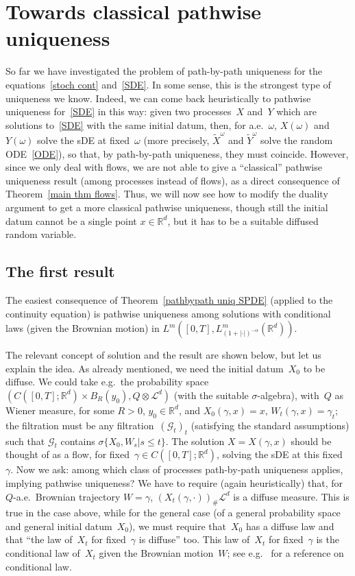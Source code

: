 \documentclass[a4paper,10pt]{article}
\newcommand\1{\mathbbm{1}}
\newcommand{\mc}{\mathcal}
\newcommand{\td}{\tilde}
\numberwithin{equation}{section}
\begin{document}
\section{Towards classical pathwise uniqueness}

So far we have investigated the problem of path-by-path uniqueness for the equations~\eqref{stoch cont} and~\eqref{SDE}. In some sense, this is the strongest type of uniqueness we know. Indeed, we can come back heuristically to pathwise uniqueness for~\eqref{SDE} in this way: given two processes~$X$ and~$Y$ which are solutions to~\eqref{SDE} with the same initial datum, then, for a.e.~$\omega$, $X(\omega)$ and $Y(\omega)$ solve the sDE at fixed~$\omega$ (more precisely, $\td{X}^\omega$ and $\td{Y}^\omega$ solve the random ODE~\eqref{ODE}), so that, by path-by-path uniqueness, they must coincide. However, since we only deal with flows, we are not able to give a ``classical'' pathwise uniqueness result (among processes instead of flows), as a direct consequence of Theorem~\ref{main thm flows}. Thus, we will now see how to modify the duality argument to get a more classical pathwise uniqueness, though still the initial datum cannot be a single point $x \in \mathbb{R}^d$, but it has to be a suitable diffused random variable.

\subsection{The first result}\label{firstpathwise}

The easiest consequence of Theorem~\ref{pathbypath uniq SPDE} (applied to the continuity equation) is pathwise uniqueness among solutions with conditional laws (given the Brownian motion) in $L^m([0,T],L^m_{(1+|\cdot|)^{-\alpha}}(\mathbb{R}^d))$.

The relevant concept of solution and the result are shown below, but let us explain the idea. As already mentioned, we need the initial datum~$X_0$ to be diffuse. We could take e.g.~the probability space $(C([0,T];\mathbb{R}^d)\times B_R(y_0),Q\otimes\mc{L}^d)$ (with the suitable $\sigma$-algebra), with~$Q$ as Wiener measure, for some $R>0$, $y_0 \in \mathbb{R}^d$, and $X_0(\gamma,x)=x$, $W_t(\gamma,x)=\gamma_t$; the filtration must be any filtration~$(\mc{G}_t)_t$ (satisfying the standard assumptions) such that $\mc{G}_t$ contains $\sigma\{X_0,W_s|s\le t\}$. The solution $X=X(\gamma,x)$ should be thought of as a flow, for fixed~$\gamma \in C([0,T];\mathbb{R}^d)$, solving the sDE at this fixed~$\gamma$. Now we ask: among which class of processes path-by-path uniqueness applies, implying pathwise uniqueness? We have to require (again heuristically) that, for $Q$-a.e.~Brownian trajectory $W=\gamma$, $(X_t(\gamma,\cdot))_\#\mc{L}^d$ is a diffuse measure. This is true in the case above, while for the general case (of a general probability space and general initial datum~$X_0$), we must require that~$X_0$ has a diffuse law and that ``the law of~$X_t$ for fixed~$\gamma$ is diffuse'' too. This law of~$X_t$ for fixed~$\gamma$ is the conditional law of~$X_t$ given the Brownian motion~$W$; see e.g.~\cite[Chapter~1]{STRVAR79} for a reference on conditional law.
\end{document}
